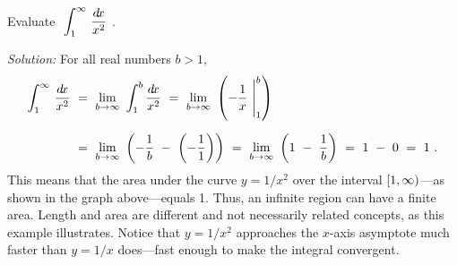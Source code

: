 \begin{exmp}\label{exmp:improper2}
\noindent Evaluate $~\displaystyle\int_1^{\infty}\,\dfrac{d\!x}{x^2}~$.\vspace{1mm}
\par\noindent\emph{Solution:} For all real numbers $b > 1$,
\begin{align*}
\int_1^{\infty}\,\dfrac{d\!x}{x^2} ~&=~ \lim_{b \to \infty}~\int_{1}^{b} \dfrac{d\!x}{x^2} ~=~
\lim_{b \to \infty}~\left(-\frac{1}{x}~\Biggr|_1^{b}\right)\\[6pt]
&=~ \lim_{b \to \infty}~ \left(-\frac{1}{b} ~-~ \left(-\frac{1}{1}\right)\right) ~=~
    \lim_{b \to \infty}~ \left(1 ~-~ \frac{1}{b}\right) ~=~ 1 ~-~ 0 ~=~ 1 ~.
\end{align*}\vspace{-10mm}
\noindent This means that the area under the curve $y=1/x^2$ over the interval
$\lbrack 1,\infty )$---as shown in the graph above---equals 1. Thus, an infinite
region can have a finite area. Length and area are different and not necessarily
related concepts, as this example illustrates. Notice that $y=1/x^2$ approaches
the $x$-axis asymptote much faster than $y=1/x$ does---fast enough to make the
integral convergent.
\end{exmp}
